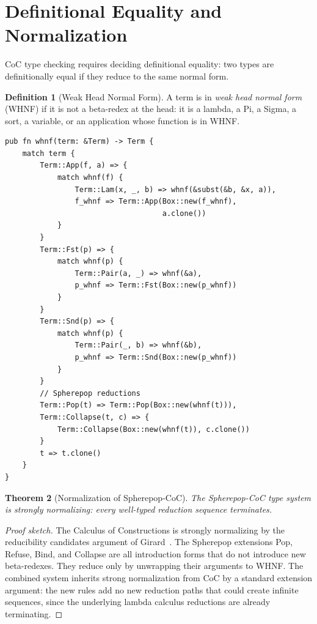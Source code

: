 \documentclass[12pt, a4paper, openany]{book}
\theoremstyle{plain}
\newtheorem{theorem}{Theorem}[chapter]
\theoremstyle{definition}
\newtheorem{definition}[theorem]{Definition}
\theoremstyle{remark}
\begin{document}
\section{Definitional Equality and Normalization}

CoC type checking requires deciding definitional equality: two types are
definitionally equal if they reduce to the same normal form.

\begin{definition}[Weak Head Normal Form]
A term is in \emph{weak head normal form} (WHNF) if it is not a beta-redex at
the head: it is a lambda, a Pi, a Sigma, a sort, a variable, or an application
whose function is in WHNF.
\end{definition}

\begin{lstlisting}[style=rust, caption={WHNF reduction for Spherepop-CoC}]
pub fn whnf(term: &Term) -> Term {
    match term {
        Term::App(f, a) => {
            match whnf(f) {
                Term::Lam(x, _, b) => whnf(&subst(&b, &x, a)),
                f_whnf => Term::App(Box::new(f_whnf),
                                    a.clone())
            }
        }
        Term::Fst(p) => {
            match whnf(p) {
                Term::Pair(a, _) => whnf(&a),
                p_whnf => Term::Fst(Box::new(p_whnf))
            }
        }
        Term::Snd(p) => {
            match whnf(p) {
                Term::Pair(_, b) => whnf(&b),
                p_whnf => Term::Snd(Box::new(p_whnf))
            }
        }
        // Spherepop reductions
        Term::Pop(t) => Term::Pop(Box::new(whnf(t))),
        Term::Collapse(t, c) => {
            Term::Collapse(Box::new(whnf(t)), c.clone())
        }
        t => t.clone()
    }
}
\end{lstlisting}

\begin{theorem}[Normalization of Spherepop-CoC]
The Spherepop-CoC type system is strongly normalizing: every well-typed
reduction sequence terminates.
\end{theorem}

\begin{proof}[Proof sketch]
The Calculus of Constructions is strongly normalizing by the reducibility
candidates argument of Girard~\cite{girard89}. The Spherepop extensions Pop,
Refuse, Bind, and Collapse are all introduction forms that do not introduce
new beta-redexes. They reduce only by unwrapping their arguments to WHNF.
The combined system inherits strong normalization from CoC by a standard
extension argument: the new rules add no new reduction paths that could create
infinite sequences, since the underlying lambda calculus reductions are already
terminating.
\end{proof}
\end{document}
